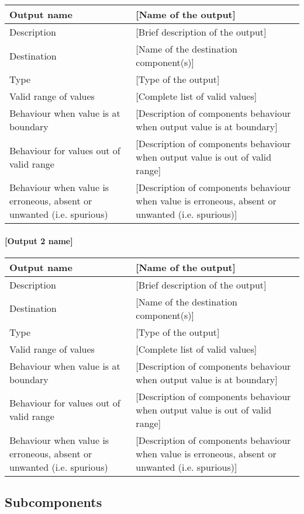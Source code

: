 \begin{longtable}{p{}p{}}
\toprule
Output name				& [Name of the output] \\
\midrule
Description				& [Brief description of the output] \\
\midrule
Destination				& [Name of the destination component(s)] \\ 
\midrule
Type					& [Type of the output] \\
\midrule
Valid range of values	& [Complete list of valid values] \\
\midrule
Behaviour when value is at boundary	& [Description of components behaviour when output value is at boundary] \\
\midrule
Behaviour for values out of valid range	& [Description of components behaviour when output value is out of valid range] \\
\midrule
Behaviour when value is erroneous, absent or unwanted (i.e. spurious) & [Description of components behaviour when value is erroneous, absent or unwanted (i.e. spurious)] \\
\bottomrule
\end{longtable}


\paragraph{[Output 2 name]}

\begin{longtable}{p{}p{}}
\toprule
Output name				& [Name of the output] \\
\midrule
Description				& [Brief description of the output] \\
\midrule
Destination				& [Name of the destination component(s)] \\ 
\midrule
Type					& [Type of the output] \\
\midrule
Valid range of values	& [Complete list of valid values] \\
\midrule
Behaviour when value is at boundary	& [Description of components behaviour when output value is at boundary] \\
\midrule
Behaviour for values out of valid range	& [Description of components behaviour when output value is out of valid range] \\
\midrule
Behaviour when value is erroneous, absent or unwanted (i.e. spurious) & [Description of components behaviour when value is erroneous, absent or unwanted (i.e. spurious)] \\
\bottomrule
\end{longtable}


\subsection{Subcomponents}\label{s:traindata_subcomponents}
%

%


